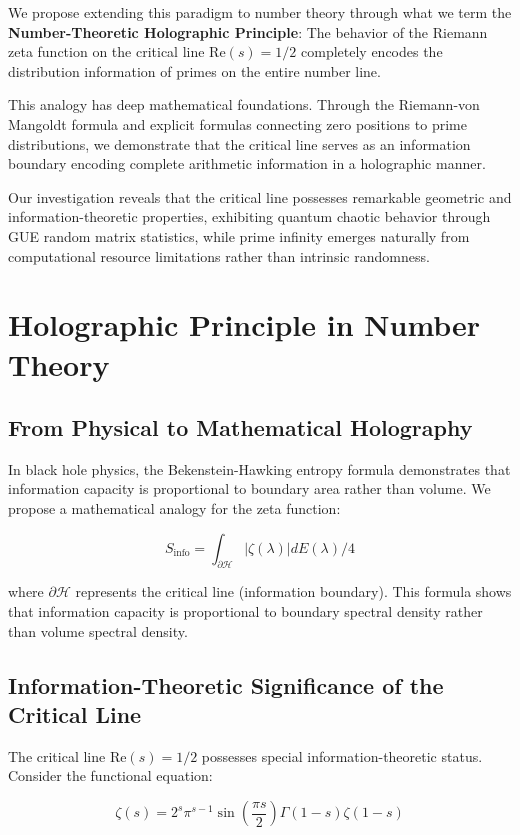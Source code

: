 \documentclass[12pt]{article}
\begin{document}
We propose extending this paradigm to number theory through what we term the \textbf{Number-Theoretic Holographic Principle}: The behavior of the Riemann zeta function on the critical line $\text{Re}(s) = 1/2$ completely encodes the distribution information of primes on the entire number line.

This analogy has deep mathematical foundations. Through the Riemann-von Mangoldt formula and explicit formulas connecting zero positions to prime distributions, we demonstrate that the critical line serves as an information boundary encoding complete arithmetic information in a holographic manner.

Our investigation reveals that the critical line possesses remarkable geometric and information-theoretic properties, exhibiting quantum chaotic behavior through GUE random matrix statistics, while prime infinity emerges naturally from computational resource limitations rather than intrinsic randomness.

\section{Holographic Principle in Number Theory}

\subsection{From Physical to Mathematical Holography}

In black hole physics, the Bekenstein-Hawking entropy formula demonstrates that information capacity is proportional to boundary area rather than volume. We propose a mathematical analogy for the zeta function:

$$S_{\text{info}} = \int_{\partial \mathcal{H}} |\zeta(\lambda)| dE(\lambda) / 4$$

where $\partial \mathcal{H}$ represents the critical line (information boundary). This formula shows that information capacity is proportional to boundary spectral density rather than volume spectral density.

\subsection{Information-Theoretic Significance of the Critical Line}

The critical line $\text{Re}(s) = 1/2$ possesses special information-theoretic status. Consider the functional equation:

$$\zeta(s) = 2^s \pi^{s-1} \sin\left(\frac{\pi s}{2}\right) \Gamma(1-s) \zeta(1-s)$$
\end{document}

